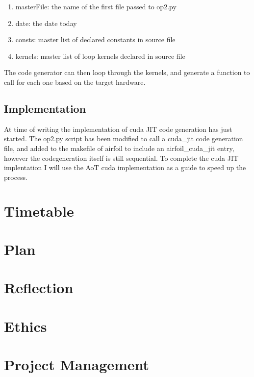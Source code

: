 \documentclass[11pt]{article}
\begin{document}
\begin{enumerate}
\item{masterFile: the name of the first file passed to op2.py}
\item{date: the date today}
\item{consts: master list of declared constants in source file}
\item{kernels: master list of loop kernels declared in source file}
\end{enumerate}
The code generator can then loop through the kernels, and generate a function to call for each one based on the target hardware.

\subsection*{Implementation}
At time of writing the implementation of cuda JIT code generation has just started. The op2.py script has been modified to call a cuda\_jit code generation file, and added to the makefile of airfoil to include an airfoil\_cuda\_jit entry, however the codegeneration itself is still sequential. To complete the cuda JIT implentation I will use the AoT cuda implementation as a guide to speed up the process.
\section*{Timetable}

\section*{Plan}

\section*{Reflection}

\section*{Ethics}

\section*{Project Management}


\clearpage
{}
\end{document}
